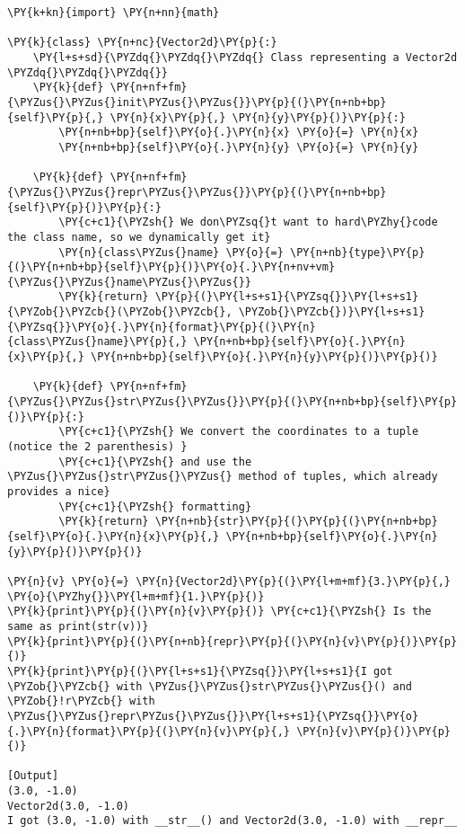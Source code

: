 \begin{Verbatim}[label=\makebox{\url{https://bitbucket.org/lbaldini/programming/src/tip/snippets/vector2d\_3.py}},commandchars=\\\{\}]
\PY{k+kn}{import} \PY{n+nn}{math}

\PY{k}{class} \PY{n+nc}{Vector2d}\PY{p}{:}
    \PY{l+s+sd}{\PYZdq{}\PYZdq{}\PYZdq{} Class representing a Vector2d \PYZdq{}\PYZdq{}\PYZdq{}}   
    \PY{k}{def} \PY{n+nf+fm}{\PYZus{}\PYZus{}init\PYZus{}\PYZus{}}\PY{p}{(}\PY{n+nb+bp}{self}\PY{p}{,} \PY{n}{x}\PY{p}{,} \PY{n}{y}\PY{p}{)}\PY{p}{:}
        \PY{n+nb+bp}{self}\PY{o}{.}\PY{n}{x} \PY{o}{=} \PY{n}{x}
        \PY{n+nb+bp}{self}\PY{o}{.}\PY{n}{y} \PY{o}{=} \PY{n}{y}
   
    \PY{k}{def} \PY{n+nf+fm}{\PYZus{}\PYZus{}repr\PYZus{}\PYZus{}}\PY{p}{(}\PY{n+nb+bp}{self}\PY{p}{)}\PY{p}{:}
        \PY{c+c1}{\PYZsh{} We don\PYZsq{}t want to hard\PYZhy{}code the class name, so we dynamically get it}
        \PY{n}{class\PYZus{}name} \PY{o}{=} \PY{n+nb}{type}\PY{p}{(}\PY{n+nb+bp}{self}\PY{p}{)}\PY{o}{.}\PY{n+nv+vm}{\PYZus{}\PYZus{}name\PYZus{}\PYZus{}}
        \PY{k}{return} \PY{p}{(}\PY{l+s+s1}{\PYZsq{}}\PY{l+s+s1}{\PYZob{}\PYZcb{}(\PYZob{}\PYZcb{}, \PYZob{}\PYZcb{})}\PY{l+s+s1}{\PYZsq{}}\PY{o}{.}\PY{n}{format}\PY{p}{(}\PY{n}{class\PYZus{}name}\PY{p}{,} \PY{n+nb+bp}{self}\PY{o}{.}\PY{n}{x}\PY{p}{,} \PY{n+nb+bp}{self}\PY{o}{.}\PY{n}{y}\PY{p}{)}\PY{p}{)}
        
    \PY{k}{def} \PY{n+nf+fm}{\PYZus{}\PYZus{}str\PYZus{}\PYZus{}}\PY{p}{(}\PY{n+nb+bp}{self}\PY{p}{)}\PY{p}{:}
        \PY{c+c1}{\PYZsh{} We convert the coordinates to a tuple (notice the 2 parenthesis) }
        \PY{c+c1}{\PYZsh{} and use the \PYZus{}\PYZus{}str\PYZus{}\PYZus{} method of tuples, which already provides a nice}
        \PY{c+c1}{\PYZsh{} formatting}
        \PY{k}{return} \PY{n+nb}{str}\PY{p}{(}\PY{p}{(}\PY{n+nb+bp}{self}\PY{o}{.}\PY{n}{x}\PY{p}{,} \PY{n+nb+bp}{self}\PY{o}{.}\PY{n}{y}\PY{p}{)}\PY{p}{)}
     
\PY{n}{v} \PY{o}{=} \PY{n}{Vector2d}\PY{p}{(}\PY{l+m+mf}{3.}\PY{p}{,} \PY{o}{\PYZhy{}}\PY{l+m+mf}{1.}\PY{p}{)}
\PY{k}{print}\PY{p}{(}\PY{n}{v}\PY{p}{)} \PY{c+c1}{\PYZsh{} Is the same as print(str(v))}
\PY{k}{print}\PY{p}{(}\PY{n+nb}{repr}\PY{p}{(}\PY{n}{v}\PY{p}{)}\PY{p}{)}
\PY{k}{print}\PY{p}{(}\PY{l+s+s1}{\PYZsq{}}\PY{l+s+s1}{I got \PYZob{}\PYZcb{} with \PYZus{}\PYZus{}str\PYZus{}\PYZus{}() and \PYZob{}!r\PYZcb{} with \PYZus{}\PYZus{}repr\PYZus{}\PYZus{}}\PY{l+s+s1}{\PYZsq{}}\PY{o}{.}\PY{n}{format}\PY{p}{(}\PY{n}{v}\PY{p}{,} \PY{n}{v}\PY{p}{)}\PY{p}{)}

[Output]
(3.0, -1.0)
Vector2d(3.0, -1.0)
I got (3.0, -1.0) with __str__() and Vector2d(3.0, -1.0) with __repr__
\end{Verbatim}